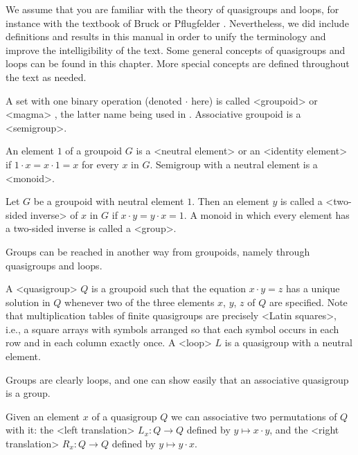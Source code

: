 
We assume that you are familiar with the theory of quasigroups and loops, for
instance with the textbook of Bruck \cite{Br} or Pflugfelder \cite{Pf}.
Nevertheless, we did include definitions and results in this manual in order to
unify the terminology and improve the intelligibility of the text. Some general
concepts of quasigroups and loops can be found in this chapter. More special
concepts are defined throughout the text as needed.


A set with one binary operation (denoted $\cdot$ here) is called
<groupoid> or <magma> , the latter name being used
in {\GAP}. Associative groupoid is a <semigroup>.

An element $1$ of a groupoid $G$ is a <neutral element>
or an <identity element> if $1\cdot x = x\cdot 1 = x$
for every $x$ in $G$. Semigroup with a neutral element is a
<monoid>.

Let $G$ be a groupoid with neutral element $1$. Then an element $y$ is called a
<two-sided inverse> of $x$ in $G$ if $x\cdot y =
y\cdot x = 1$. A monoid in which every element has a two-sided inverse is
called a <group>.

Groups can be reached in another way from groupoids, namely through quasigroups
and loops.

A <quasigroup> $Q$ is a groupoid such that the equation
$x\cdot y=z$ has a unique solution in $Q$ whenever two of the three elements
$x$, $y$, $z$ of $Q$ are specified. Note that multiplication tables of finite
quasigroups are precisely <Latin squares>, i.e., a square
arrays with symbols arranged so that each symbol occurs in each row and in each
column exactly once. A <loop> $L$ is a quasigroup with a neutral
element.

Groups are clearly loops, and one can show easily that an associative
quasigroup is a group.


Given an element $x$ of a quasigroup $Q$ we can associative two permutations of
$Q$ with it: the <left translation> $L_x:Q\to Q$
defined by $y\mapsto x\cdot y$, and the <right
translation> $R_x:Q\to Q$ defined by $y\mapsto y\cdot
x$.

